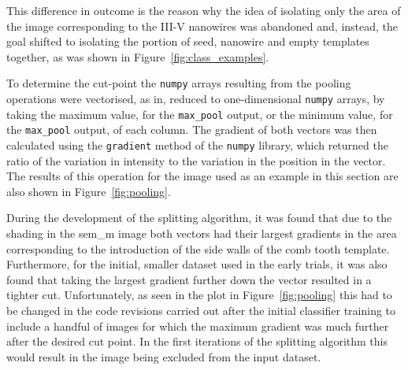 This difference in outcome is the reason why the idea of isolating only the area of the image corresponding to the III-V nanowires was abandoned and, instead, the goal shifted to isolating the portion of seed, nanowire and empty templates together, as was shown in Figure~\ref{fig:class_examples}.

To determine the cut-point the \texttt{numpy} arrays resulting from the pooling operations were vectorised, as in, reduced to one-dimensional \texttt{numpy} arrays, by taking the maximum value, for the \texttt{max\_pool} output, or the minimum value, for the \texttt{max\_pool} output, of each column. The gradient of both vectors was then calculated using the \texttt{gradient} method of the \texttt{numpy} library, which returned the ratio of the variation in intensity to the variation in the position in the vector. The results of this operation for the image used as an example in this section are also shown in Figure~\ref{fig:pooling}.

During the development of the splitting algorithm, it was found that due to the shading in the \acs{sem_m} image both vectors had their largest gradients in the area corresponding to the introduction of the side walls of the comb tooth template. Furthermore, for the initial, smaller dataset used in the early trials, it was also found that taking the largest gradient further down the vector resulted in a tighter cut. Unfortunately, as seen in the plot in Figure~\ref{fig:pooling} this had to be changed in the code revisions carried out after the initial classifier training to include a handful of images for which the maximum gradient was much further after the desired cut point. In the first iterations of the splitting algorithm this would result in the image being excluded from the input dataset.

